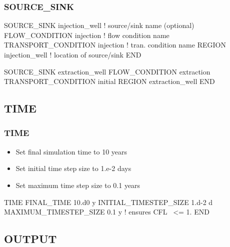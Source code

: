 \documentclass{beamer}
\newcommand\bluecomment[1]{{{\color{blue} #1}}}
\begin{document}
\begin{frame}\frametitle{SOURCE\_SINK}

\begin{semiverbatim}
SOURCE_SINK injection_well   \bluecomment{! source/sink name (optional)}
  FLOW_CONDITION injection       \bluecomment{! flow condition name}
  TRANSPORT_CONDITION injection  \bluecomment{! tran. condition name}
  REGION injection_well        \bluecomment{! location of source/sink}
END

SOURCE_SINK extraction_well
  FLOW_CONDITION extraction
  TRANSPORT_CONDITION initial
  REGION extraction_well
END
\end{semiverbatim}

\end{frame}

\subsection{TIME}

\begin{frame}[fragile]\frametitle{TIME}

\begin{itemize}
\item Set final simulation time to 10 years
\item Set initial time step size to 1.e-2 days
\item Set maximum time step size to 0.1 years
\end{itemize}


\begin{semiverbatim}

TIME
  FINAL_TIME 10.d0 y
  INITIAL_TIMESTEP_SIZE 1.d-2 d
  MAXIMUM_TIMESTEP_SIZE 0.1 y    \bluecomment{! ensures CFL ~<= 1.}
END
\end{semiverbatim}

\end{frame}

\subsection{OUTPUT}
\end{document}
